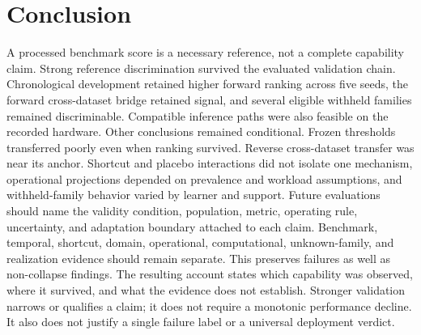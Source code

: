 \documentclass[preprint,12pt]{elsarticle}
\begin{document}
\section{Conclusion}
A processed benchmark score is a necessary reference, not a complete capability claim. Strong reference discrimination survived the evaluated validation chain. Chronological development retained higher forward ranking across five seeds, the forward cross-dataset bridge retained signal, and several eligible withheld families remained discriminable. Compatible inference paths were also feasible on the recorded hardware.
Other conclusions remained conditional. Frozen thresholds transferred poorly even when ranking survived. Reverse cross-dataset transfer was near its anchor. Shortcut and placebo interactions did not isolate one mechanism, operational projections depended on prevalence and workload assumptions, and withheld-family behavior varied by learner and support.
Future evaluations should name the validity condition, population, metric, operating rule, uncertainty, and adaptation boundary attached to each claim. Benchmark, temporal, shortcut, domain, operational, computational, unknown-family, and realization evidence should remain separate. This preserves failures as well as non-collapse findings. The resulting account states which capability was observed, where it survived, and what the evidence does not establish.
Stronger validation narrows or qualifies a claim; it does not require a monotonic performance decline. It also does not justify a single failure label or a universal deployment verdict.



\end{document}
